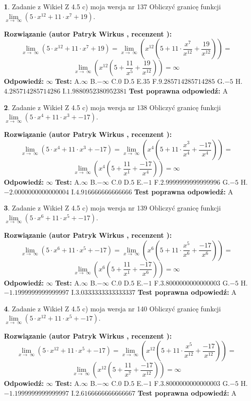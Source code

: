 \documentclass[12pt, a4paper]{article}
\theoremstyle{definition} %
\newtheorem{zad}{}
\newcommand{\zadStart}[1]{\begin{zad}#1\newline}
\newcommand{\zadStop}{\end{zad}}
\newcommand{\rozwStart}[2]{\noindent \textbf{Rozwiązanie (autor #1 , recenzent #2): }\newline}
\newcommand{\rozwStop}{\newline}
\newcommand{\odpStart}{\noindent \textbf{Odpowiedź:}\newline}
\newcommand{\odpStop}{\newline}
\newcommand{\testStart}{\noindent \textbf{Test:}\newline}
\newcommand{\testStop}{\newline}
\newcommand{\kluczStart}{\noindent \textbf{Test poprawna odpowiedź:}\newline}
\newcommand{\kluczStop}{\newline}
\begin{document}
\zadStart{Zadanie z Wikieł Z 4.5 c) moja wersja nr 137}
Obliczyć granicę funkcji  $\lim\limits_{x\to\ \infty}(5 \cdot x^{12}+11 \cdot x^{7}+19)$.
\zadStop
\rozwStart{Patryk Wirkus}{}
$$\lim\limits_{x\to\ \infty}(5 \cdot x^{12}+11 \cdot x^{7}+19) = \lim\limits_{x\to\ \infty}(x^{12}(5 +11 \cdot \frac{x^{7}}{x^{12}}+\frac{19}{x^{12}})) =$$ $$\lim\limits_{x\to\ \infty}(x^{12}(5 +\frac{11}{x^{5}}+\frac{19}{x^{12}})) =\infty$$
\rozwStop
\odpStart
$\infty$
\odpStop
\testStart
A.$\infty$ B.$-\infty$ C.$0$ D.$5$ E.$35$
F.$9.285714285714285$ G.$-5$
H.$4.285714285714286$
I.$1.9880952380952381$
\testStop
\kluczStart
A
\kluczStop



\zadStart{Zadanie z Wikieł Z 4.5 c) moja wersja nr 138}
Obliczyć granicę funkcji  $\lim\limits_{x\to\ \infty}(5 \cdot x^{4}+11 \cdot x^{3}+-17)$.
\zadStop
\rozwStart{Patryk Wirkus}{}
$$\lim\limits_{x\to\ \infty}(5 \cdot x^{4}+11 \cdot x^{3}+-17) = \lim\limits_{x\to\ \infty}(x^{4}(5 +11 \cdot \frac{x^{3}}{x^{4}}+\frac{-17}{x^{4}})) =$$ $$\lim\limits_{x\to\ \infty}(x^{4}(5 +\frac{11}{x^{1}}+\frac{-17}{x^{4}})) =\infty$$
\rozwStop
\odpStart
$\infty$
\odpStop
\testStart
A.$\infty$ B.$-\infty$ C.$0$ D.$5$ E.$-1$
F.$2.9999999999999996$ G.$-5$
H.$-2.0000000000000004$
I.$4.916666666666666$
\testStop
\kluczStart
A
\kluczStop



\zadStart{Zadanie z Wikieł Z 4.5 c) moja wersja nr 139}
Obliczyć granicę funkcji  $\lim\limits_{x\to\ \infty}(5 \cdot x^{6}+11 \cdot x^{5}+-17)$.
\zadStop
\rozwStart{Patryk Wirkus}{}
$$\lim\limits_{x\to\ \infty}(5 \cdot x^{6}+11 \cdot x^{5}+-17) = \lim\limits_{x\to\ \infty}(x^{6}(5 +11 \cdot \frac{x^{5}}{x^{6}}+\frac{-17}{x^{6}})) =$$ $$\lim\limits_{x\to\ \infty}(x^{6}(5 +\frac{11}{x^{1}}+\frac{-17}{x^{6}})) =\infty$$
\rozwStop
\odpStart
$\infty$
\odpStop
\testStart
A.$\infty$ B.$-\infty$ C.$0$ D.$5$ E.$-1$
F.$3.8000000000000003$ G.$-5$
H.$-1.1999999999999997$
I.$3.0333333333333337$
\testStop
\kluczStart
A
\kluczStop



\zadStart{Zadanie z Wikieł Z 4.5 c) moja wersja nr 140}
Obliczyć granicę funkcji  $\lim\limits_{x\to\ \infty}(5 \cdot x^{12}+11 \cdot x^{5}+-17)$.
\zadStop
\rozwStart{Patryk Wirkus}{}
$$\lim\limits_{x\to\ \infty}(5 \cdot x^{12}+11 \cdot x^{5}+-17) = \lim\limits_{x\to\ \infty}(x^{12}(5 +11 \cdot \frac{x^{5}}{x^{12}}+\frac{-17}{x^{12}})) =$$ $$\lim\limits_{x\to\ \infty}(x^{12}(5 +\frac{11}{x^{7}}+\frac{-17}{x^{12}})) =\infty$$
\rozwStop
\odpStart
$\infty$
\odpStop
\testStart
A.$\infty$ B.$-\infty$ C.$0$ D.$5$ E.$-1$
F.$3.8000000000000003$ G.$-5$
H.$-1.1999999999999997$
I.$2.6166666666666667$
\testStop
\kluczStart
A
\kluczStop
\end{document}
